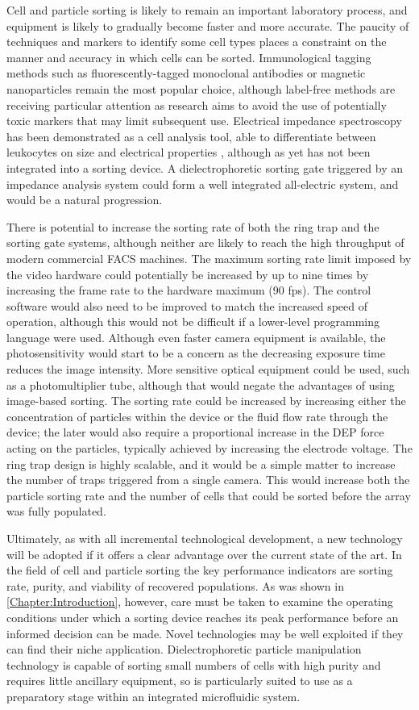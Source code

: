 Cell and particle sorting is likely to remain an important laboratory process, and equipment is likely to gradually become faster and more accurate. The paucity of techniques and markers to identify some cell types places a constraint on the manner and accuracy in which cells can be sorted. Immunological tagging methods such as fluorescently-tagged monoclonal antibodies or magnetic nanoparticles remain the most popular choice, although label-free methods are receiving particular attention as research aims to avoid the use of potentially toxic markers that may limit subsequent use. Electrical impedance spectroscopy has been demonstrated as a cell analysis tool, able to differentiate between leukocytes on size and electrical properties \citep{Holmes:2007}, although as yet has not been integrated into a sorting device. A dielectrophoretic sorting gate triggered by an impedance analysis system could form a well integrated all-electric system, and would be a natural progression.

There is potential to increase the sorting rate of both the ring trap and the sorting gate systems, although neither are likely to reach the high throughput of modern commercial FACS machines. The maximum sorting rate limit imposed by the video hardware could potentially be increased by up to nine times by increasing the frame rate to the hardware maximum (90 fps). The control software would also need to be improved to match the increased speed of operation, although this would not be difficult if a lower-level programming language were used. Although even faster camera equipment is available, the photosensitivity would start to be a concern as the decreasing exposure time reduces the image intensity. More sensitive optical equipment could be used, such as a photomultiplier tube, although that would negate the advantages of using image-based sorting. The sorting rate could be increased by increasing either the concentration of particles within the device or the fluid flow rate through the device; the later would also require a proportional increase in the DEP force acting on the particles, typically achieved by increasing the electrode voltage. The ring trap design is highly scalable, and it would be a simple matter to increase the number of traps triggered from a single camera. This would increase both the particle sorting rate and the number of cells that could be sorted before the array was fully populated. 

Ultimately, as with all incremental technological development, a new technology will be adopted if it offers a clear advantage over the current state of the art. In the field of cell and particle sorting the key performance indicators are sorting rate, purity, and viability of recovered populations. As was shown in \cref{Chapter:Introduction}, however, care must be taken to examine the operating conditions under which a sorting device reaches its peak performance before an informed decision can be made. Novel technologies may be well exploited if they can find their niche application. Dielectrophoretic particle manipulation technology is capable of sorting small numbers of cells with high purity and requires little ancillary equipment, so is particularly suited to use as a preparatory stage within an integrated microfluidic system.

